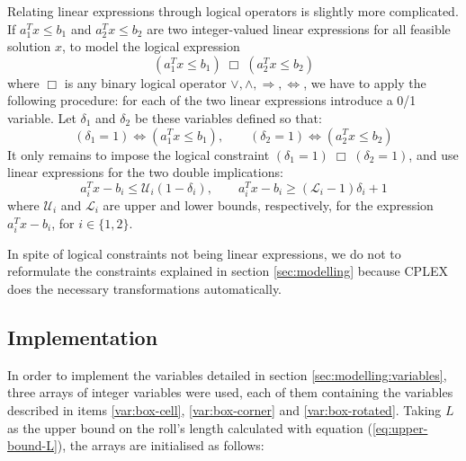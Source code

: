 Relating linear expressions through logical operators is slightly more complicated.
If $a_1^Tx \le b_1$ and $a_2^Tx \le b_2$ are two integer-valued linear expressions
for all feasible solution $x$, to model the logical expression
\[
(a_1^Tx \le b_1) \;\Box\; (a_2^Tx \le b_2)
\]
where $\Box$ is any binary logical operator $\vee,\wedge,\Longrightarrow,\Longleftrightarrow$,
we have to apply the following procedure: for each of the two linear expressions introduce a 0/1
variable. Let $\delta_1$ and $\delta_2$ be these variables defined so that:
\[
(\delta_1 = 1) \Longleftrightarrow (a_1^Tx \le b_1), \qquad 
(\delta_2 = 1) \Longleftrightarrow (a_2^Tx \le b_2)
\]
It only remains to impose the logical constraint $(\delta_1 = 1) \;\Box\; (\delta_2 = 1)$,
and use linear expressions for the two double implications:
\[
a_i^Tx - b_i \le \mathcal{U}_i(1 - \delta_i), \qquad a_i^Tx - b_i \ge (\mathcal{L}_i - 1)\delta_i + 1
\]
where $\mathcal{U}_i$ and $\mathcal{L}_i$ are upper and lower bounds, respectively, for
the expression $a_i^Tx - b_i$, for $i\in\{1,2\}$.

\hfill

In spite of logical constraints not being linear expressions, we do not to reformulate
the constraints explained in section \ref{sec:modelling} because CPLEX does the necessary
transformations automatically.

\subsection{Implementation}
\label{sec:linear-programming:implementation}

In order to implement the variables detailed in section \ref{sec:modelling:variables},
three arrays of integer variables were used, each of them containing the variables described
in items \ref{var:box-cell}, \ref{var:box-corner} and \ref{var:box-rotated}. Taking
$L$ as the upper bound on the roll's length calculated with equation (\ref{eq:upper-bound-L}),
the arrays are initialised as follows:


